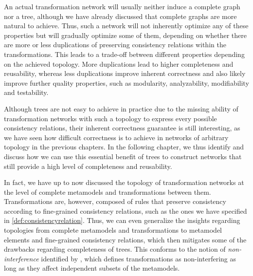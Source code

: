 An actual transformation network will usually neither induce a complete graph nor a tree, although we have already discussed that complete graphs are more natural to achieve.
Thus, such a network will not inherently optimize any of these properties but will gradually optimize some of them, depending on whether there are more or less duplications of preserving consistency relations within the transformations.
This leads to a trade-off between different properties depending on the achieved topology.
More duplications lead to higher completeness and reusability, whereas less duplications improve inherent correctness and also likely improve further quality properties, such as modularity, analyzability, modifiability and testability.

Although trees are not easy to achieve in practice due to the missing ability of transformation networks with such a topology to express every possible consistency relations, their inherent correctness guarantee is still interesting, as we have seen how difficult correctness is to achieve in networks of arbitrary topology in the previous chapters.
In the following chapter, we thus identify and discuss how we can use this essential benefit of trees to construct networks that still provide a high level of completeness and reusability.

In fact, we have up to now discussed the topology of transformation networks at the level of complete metamodels and transformations between them.
Transformations are, however, composed of rules that preserve consistency according to fine-grained consistency relations, such as the ones we have specified in \autoref{def:consistencyrelation}.
Thus, we can even generalize the insights regarding topologies from complete metamodels and transformations to metamodel elements and fine-grained consistency relations, which then mitigates some of the drawbacks regarding completeness of trees.
This conforms to the notion of \emph{non-interference} identified by \textcite{stevens2020BidirectionalTransformationLarge-SoSym}, which defines transformations as non-interfering as long as they affect independent subsets of the metamodels.



